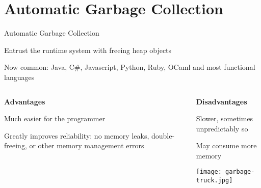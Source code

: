 \documentclass{plt}
\begin{document}
\part{Automatic Garbage Collection}

\begin{frame}{Automatic Garbage Collection}

Entrust the runtime system with freeing heap objects

Now common: Java, C\#, Javascript, Python, Ruby, OCaml and most
functional languages

\medskip

\begin{columns}[t]
\begin{column}{0.5\textwidth}
\baselineskip
\textbf{Advantages}

Much easier for the programmer

Greatly improves reliability: no memory leaks, double-freeing, or
other memory management errors
\end{column}
\begin{column}{0.5\textwidth}
\baselineskip
\textbf{Disadvantages}

Slower, sometimes unpredictably so

May consume more memory

\texttt{[image: garbage-truck.jpg]}

\end{column}
\end{columns}

\end{frame}
\end{document}
